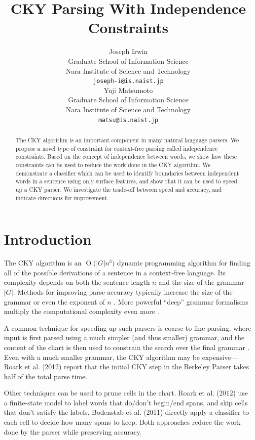 \documentclass[11pt]{article}
\title{CKY Parsing With Independence Constraints}
\author{Joseph Irwin \\
  Graduate School of Information Science\hspace{1em} \\
  Nara Institute of Science and Technology\hspace{1em} \\
  {\tt joseph-i@is.naist.jp} \\\And
  Yuji Matsumoto \\
  Graduate School of Information Science \\
  Nara Institute of Science and Technology \\
  {\tt matsu@is.naist.jp} \\}
\newcommand{\BigO}[1]{\ensuremath{\operatorname{O}\bigl(#1\bigr)}}
\begin{document}
\maketitle

\begin{abstract}
The CKY algorithm is an important component in many natural language
parsers. We propose a novel type of constraint for context-free
parsing called independence constraints. Based on the concept
of independence between words, we show how these constraints can be
used to reduce the work done in the CKY algorithm. We demonstrate a
classifier which can be used to identify boundaries between
independent words in a sentence using only surface features, and show
that it can be used to speed up a CKY parser. We investigate the
trade-off between speed and accuracy, and indicate directions for
improvement.
\end{abstract}

\section{Introduction}
\label{sec-1}



The CKY algorithm is an \BigO{|G|n^3} dynamic programming
algorithm for finding all of the possible derivations of a sentence in
a context-free language. Its complexity depends on both the sentence
length $n$ and the size of the grammar $|G|$. Methods for improving
parse accuracy typically increase the size of the grammar 
\cite{Klein2003,Petrov2007} or even the exponent of $n$ \cite{Eisner1999}. 
More powerful “deep” grammar formalisms multiply the computational
complexity even more \cite{Bangalore1999}.

A common technique for speeding up such parsers is coarse-to-fine
parsing, where input is first parsed using a much simpler (and thus
smaller) grammar, and the content of the chart is then used to
constrain the search over the final grammar
\cite{Torisawa2000,Charniak2005,Petrov2007}. Even with a much smaller
grammar, the CKY algorithm may be expensive---Roark et al. (2012)
report that the initial CKY step in the Berkeley Parser takes half of
the total parse time.

Other techniques can be used to prune cells in the chart. Roark et al.
(2012) use a finite-state model to label words that do/don't begin/end
spans, and skip cells that don't satisfy the labels. Bodenstab et al.
(2011) directly apply a classifier to each cell to decide how many
spans to keep. Both approaches reduce the work done by the parser
while preserving accuracy.
\end{document}
